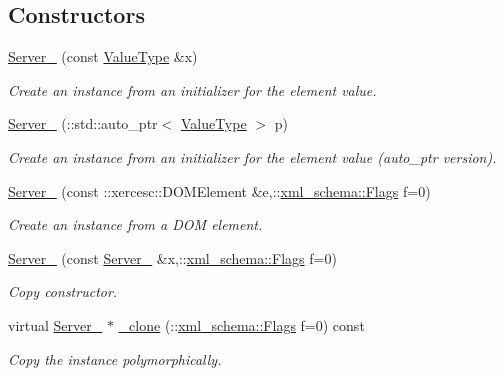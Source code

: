 \subsection*{Constructors}
\begin{DoxyCompactItemize}
\item 
\hyperlink{classopenstack_1_1xml_1_1Server___aed14657c07fe8c787055494caf02a4f6}{Server\_\-} (const \hyperlink{classopenstack_1_1xml_1_1Server}{ValueType} \&x)
\begin{DoxyCompactList}\small\item\em Create an instance from an initializer for the element value. \item\end{DoxyCompactList}\item 
\hyperlink{classopenstack_1_1xml_1_1Server___a461b2f758e5d6609564b67c564df5ae4}{Server\_\-} (::std::auto\_\-ptr$<$ \hyperlink{classopenstack_1_1xml_1_1Server}{ValueType} $>$ p)
\begin{DoxyCompactList}\small\item\em Create an instance from an initializer for the element value (auto\_\-ptr version). \item\end{DoxyCompactList}\item 
\hyperlink{classopenstack_1_1xml_1_1Server___a2e585d8793052508d81b8c24d573bc9c}{Server\_\-} (const ::xercesc::DOMElement \&e,::\hyperlink{namespacexml__schema_affb4c227cbd9aa7453dd1dc5a1401943}{xml\_\-schema::Flags} f=0)
\begin{DoxyCompactList}\small\item\em Create an instance from a DOM element. \item\end{DoxyCompactList}\item 
\hyperlink{classopenstack_1_1xml_1_1Server___a51ff3af8a26fd2c324d1cc6a75989a1a}{Server\_\-} (const \hyperlink{classopenstack_1_1xml_1_1Server__}{Server\_\-} \&x,::\hyperlink{namespacexml__schema_affb4c227cbd9aa7453dd1dc5a1401943}{xml\_\-schema::Flags} f=0)
\begin{DoxyCompactList}\small\item\em Copy constructor. \item\end{DoxyCompactList}\item 
virtual \hyperlink{classopenstack_1_1xml_1_1Server__}{Server\_\-} $\ast$ \hyperlink{classopenstack_1_1xml_1_1Server___a1460b463f10db1387f1f1441c13e7d37}{\_\-clone} (::\hyperlink{namespacexml__schema_affb4c227cbd9aa7453dd1dc5a1401943}{xml\_\-schema::Flags} f=0) const 
\begin{DoxyCompactList}\small\item\em Copy the instance polymorphically. \item\end{DoxyCompactList}\end{DoxyCompactItemize}
